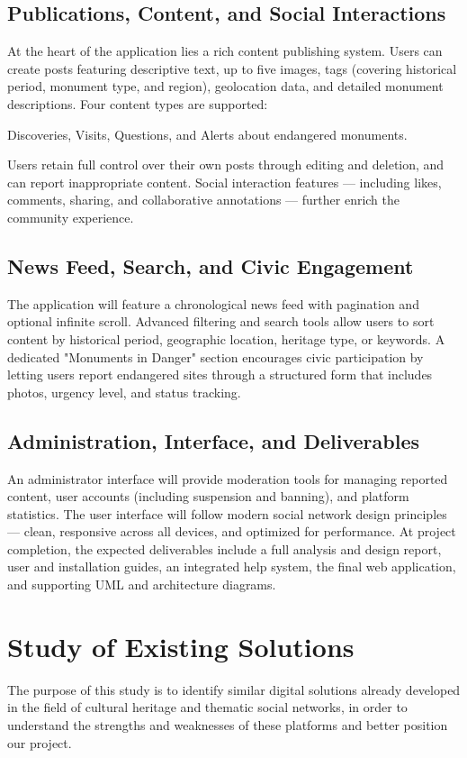 \documentclass[12pt]{article}
\begin{document}
\subsection{Publications, Content, and Social Interactions}
At the heart of the application lies a rich content publishing system. Users can create posts featuring descriptive text, up to five images, tags (covering historical period, monument type, and region), geolocation data, and detailed monument descriptions. Four content types are supported:

Discoveries, Visits, Questions, and Alerts about endangered monuments.

Users retain full control over their own posts through editing and deletion, and can report inappropriate content. Social interaction features — including likes, comments, sharing, and collaborative annotations — further enrich the community experience.

\subsection{News Feed, Search, and Civic Engagement}
The application will feature a chronological news feed with pagination and optional infinite scroll. Advanced filtering and search tools allow users to sort content by historical period, geographic location, heritage type, or keywords. A dedicated "Monuments in Danger" section encourages civic participation by letting users report endangered sites through a structured form that includes photos, urgency level, and status tracking.
\subsection{Administration, Interface, and Deliverables}
An administrator interface will provide moderation tools for managing reported content, user accounts (including suspension and banning), and platform statistics. The user interface will follow modern social network design principles — clean, responsive across all devices, and optimized for performance. At project completion, the expected deliverables include a full analysis and design report, user and installation guides, an integrated help system, the final web application, and supporting UML and architecture diagrams.

\newpage

\section{Study of Existing Solutions}
The purpose of this study is to identify similar digital solutions already developed in the field of cultural heritage and thematic social networks, in order to understand the strengths and weaknesses of these platforms and better position our project.
\end{document}
